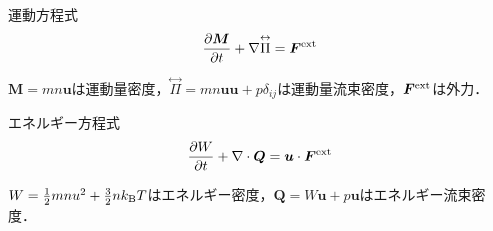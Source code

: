 \documentclass{report}
\begin{document}
  \begin{itembox}[l]{運動方程式}
    \begin{align}
      \pdv{\bm{M}}{t} + \nabla \overset{\leftrightarrow}{\Pi} = \bm{F}^{\mathrm{ext}}
    \end{align}
  \end{itembox}
  $\bm{M}=mn\bm{u}$は運動量密度，$\overset{\leftrightarrow}{\Pi} = mn\bm{u}\bm{u} + p \delta_{ij}$は運動量流束密度，$\bm{F}^{\mathrm{ext}}$は外力．

  \begin{itembox}[l]{エネルギー方程式}
    \begin{align}
      \pdv{W}{t} + \nabla \cdot \bm{Q} = \bm{u} \cdot \bm{F}^{\mathrm{ext}}
    \end{align}
  \end{itembox}
  $W = \frac{1}{2} mn u^2 + \frac{3}{2} n k_{\mathrm{B}} T$はエネルギー密度，$\bm{Q} = W\bm{u} + p\bm{u}$はエネルギー流束密度．
\end{document}
